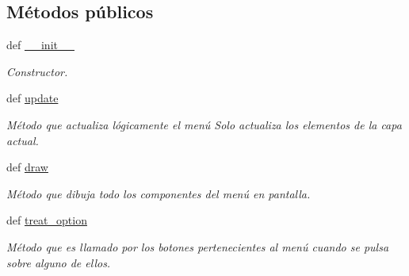\subsection*{\-Métodos públicos}
\begin{DoxyCompactItemize}
\item 
def \hyperlink{classengine_1_1circuitmenu_1_1CircuitMenu_aefbfa269ce531ce89c3bcb0cc24227ee}{\-\_\-\-\_\-init\-\_\-\-\_\-}
\begin{DoxyCompactList}\small\item\em \-Constructor. \end{DoxyCompactList}\item 
\hypertarget{classengine_1_1circuitmenu_1_1CircuitMenu_a9c371c5d0b8e07aae3f5e1102cba35ed}{
def \hyperlink{classengine_1_1circuitmenu_1_1CircuitMenu_a9c371c5d0b8e07aae3f5e1102cba35ed}{update}}
\label{classengine_1_1circuitmenu_1_1CircuitMenu_a9c371c5d0b8e07aae3f5e1102cba35ed}

\begin{DoxyCompactList}\small\item\em \-Método que actualiza lógicamente el menú \-Solo actualiza los elementos de la capa actual. \end{DoxyCompactList}\item 
def \hyperlink{classengine_1_1circuitmenu_1_1CircuitMenu_a64eff349a0a62c5693da4b0648c1e8ff}{draw}
\begin{DoxyCompactList}\small\item\em \-Método que dibuja todo los componentes del menú en pantalla. \end{DoxyCompactList}\item 
def \hyperlink{classengine_1_1circuitmenu_1_1CircuitMenu_ae557b93a13fd2a9c2b3f77569f4ecfef}{treat\-\_\-option}
\begin{DoxyCompactList}\small\item\em \-Método que es llamado por los botones pertenecientes al menú cuando se pulsa sobre alguno de ellos. \end{DoxyCompactList}\end{DoxyCompactItemize}
